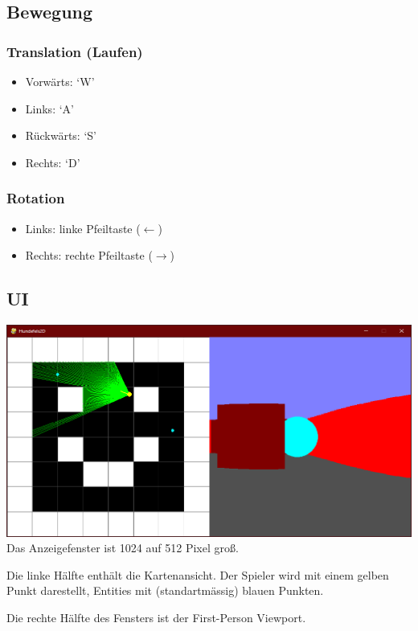 \documentclass[a4paper,titlepage]{article}
\begin{document}
\subsection{Bewegung}

\subsubsection*{Translation (Laufen)}
\begin{itemize}
\item Vorwärts: `W'
\item Links: `A'
\item Rückwärts: `S'
\item Rechts: `D'
\end{itemize}

\subsubsection*{Rotation}
\begin{itemize}
\item Links: linke Pfeiltaste ($\leftarrow$)
\item Rechts: rechte Pfeiltaste ($\rightarrow$)
\end{itemize}

\subsection{UI}
\includegraphics[scale=0.5]{./img/ui3}\\
Das Anzeigefenster ist 1024 auf 512 Pixel groß.

Die linke Hälfte enthält die Kartenansicht. Der Spieler wird mit einem gelben Punkt darestellt, Entities mit (standartmässig) blauen Punkten.

Die rechte Hälfte des Fensters ist der First-Person Viewport.
\end{document}
